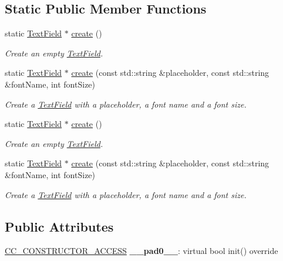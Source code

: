 \subsection*{Static Public Member Functions}
\begin{DoxyCompactItemize}
\item 
static \hyperlink{classui_1_1TextField}{Text\+Field} $\ast$ \hyperlink{classui_1_1TextField_a3a140ed620e5704d472a9f5d3dc4c6ea}{create} ()
\begin{DoxyCompactList}\small\item\em Create an empty \hyperlink{classui_1_1TextField}{Text\+Field}. \end{DoxyCompactList}\item 
static \hyperlink{classui_1_1TextField}{Text\+Field} $\ast$ \hyperlink{classui_1_1TextField_a7a10ab9fc631a62e046e59cf6e412c82}{create} (const std\+::string \&placeholder, const std\+::string \&font\+Name, int font\+Size)
\begin{DoxyCompactList}\small\item\em Create a \hyperlink{classui_1_1TextField}{Text\+Field} with a placeholder, a font name and a font size. \end{DoxyCompactList}\item 
static \hyperlink{classui_1_1TextField}{Text\+Field} $\ast$ \hyperlink{classui_1_1TextField_a6af38c2128e1b7a625351076208fedd8}{create} ()
\begin{DoxyCompactList}\small\item\em Create an empty \hyperlink{classui_1_1TextField}{Text\+Field}. \end{DoxyCompactList}\item 
static \hyperlink{classui_1_1TextField}{Text\+Field} $\ast$ \hyperlink{classui_1_1TextField_a6bd4328fe0f0dc84831f45b2e49a2b1a}{create} (const std\+::string \&placeholder, const std\+::string \&font\+Name, int font\+Size)
\begin{DoxyCompactList}\small\item\em Create a \hyperlink{classui_1_1TextField}{Text\+Field} with a placeholder, a font name and a font size. \end{DoxyCompactList}\end{DoxyCompactItemize}
\subsection*{Public Attributes}
\begin{DoxyCompactItemize}
\item 
\mbox{\label{classui_1_1TextField_a5d5a82a14a71d806a3540c2e3a0de830}} 
\hyperlink{_2cocos2d_2cocos_2base_2ccConfig_8h_a25ef1314f97c35a2ed3d029b0ead6da0}{C\+C\+\_\+\+C\+O\+N\+S\+T\+R\+U\+C\+T\+O\+R\+\_\+\+A\+C\+C\+E\+SS} {\bfseries \+\_\+\+\_\+pad0\+\_\+\+\_\+}\+: virtual bool init() override
\end{DoxyCompactItemize}
